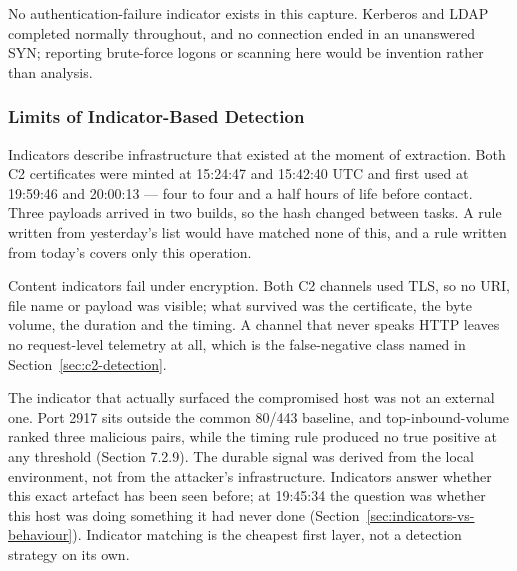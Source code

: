 No authentication-failure indicator exists in this capture. Kerberos and LDAP completed normally throughout, and no connection ended in an unanswered SYN; reporting brute-force logons or scanning here would be invention rather than analysis.

\subsubsection{Limits of Indicator-Based Detection}

Indicators describe infrastructure that existed at the moment of extraction. Both C2 certificates were minted at 15:24:47 and 15:42:40 UTC and first used at 19:59:46 and 20:00:13 --- four to four and a half hours of life before contact. Three payloads arrived in two builds, so the hash changed between tasks. A rule written from yesterday's list would have matched none of this, and a rule written from today's covers only this operation.

Content indicators fail under encryption. Both C2 channels used TLS, so no URI, file name or payload was visible; what survived was the certificate, the byte volume, the duration and the timing. A channel that never speaks HTTP leaves no request-level telemetry at all, which is the false-negative class named in Section~\ref{sec:c2-detection}.

The indicator that actually surfaced the compromised host was not an external one. Port 2917 sits outside the common 80/443 baseline, and top-inbound-volume ranked three malicious pairs, while the timing rule produced no true positive at any threshold (Section 7.2.9). The durable signal was derived from the local environment, not from the attacker's infrastructure. Indicators answer whether this exact artefact has been seen before; at 19:45:34 the question was whether this host was doing something it had never done (Section~\ref{sec:indicators-vs-behaviour}). Indicator matching is the cheapest first layer, not a detection strategy on its own.
